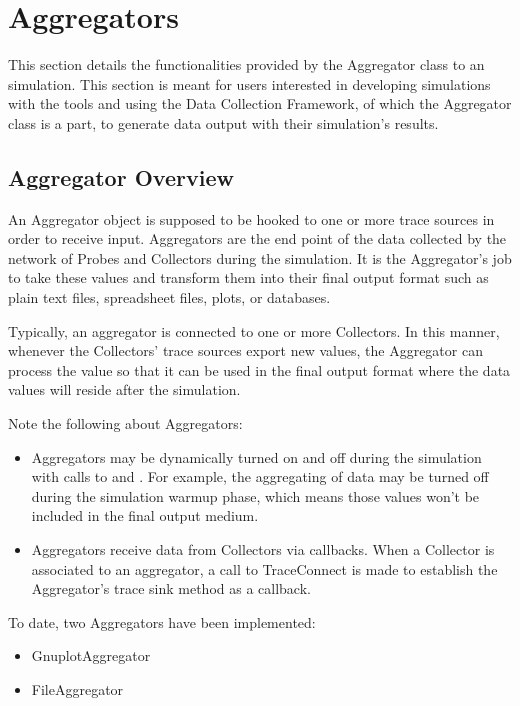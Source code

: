 \documentclass[letterpaper,10pt,english]{sphinxmanual}
\renewcommand{\sphinxcode}[1]{\texttt{\small{#1}}}
\begin{document}
\section{Aggregators}
\label{\detokenize{aggregator:aggregators}}\label{\detokenize{aggregator::doc}}
This section details the functionalities provided by the Aggregator
class to an  simulation. This section is meant for users
interested in developing simulations with the  tools and using
the Data Collection Framework, of which the Aggregator class is a
part, to generate data output with their simulation’s results.


\subsection{Aggregator Overview}
\label{\detokenize{aggregator:aggregator-overview}}
An Aggregator object is supposed to be hooked to one or more trace
sources in order to receive input. Aggregators are the end point of
the data collected by the network of Probes and Collectors during the
simulation.  It is the Aggregator’s job to take these values and
transform them into their final output format such as plain text
files, spreadsheet files, plots, or databases.

Typically, an aggregator is connected to one or more Collectors.  In
this manner, whenever the Collectors’ trace sources export new values,
the Aggregator can process the value so that it can be used in the
final output format where the data values will reside after the
simulation.

Note the following about Aggregators:
\begin{itemize}
\item {} 
Aggregators may be dynamically turned on and off during the
simulation with calls to \sphinxcode{} and \sphinxcode{}.  For
example, the aggregating of data may be turned off during the
simulation warmup phase, which means those values won’t be included
in the final output medium.

\item {} 
Aggregators receive data from Collectors via callbacks. When a
Collector is associated to an aggregator, a call to TraceConnect is
made to establish the Aggregator’s trace sink method as a callback.

\end{itemize}

To date, two Aggregators have been implemented:
\begin{itemize}
\item {} 
GnuplotAggregator

\item {} 
FileAggregator

\end{itemize}
\end{document}
